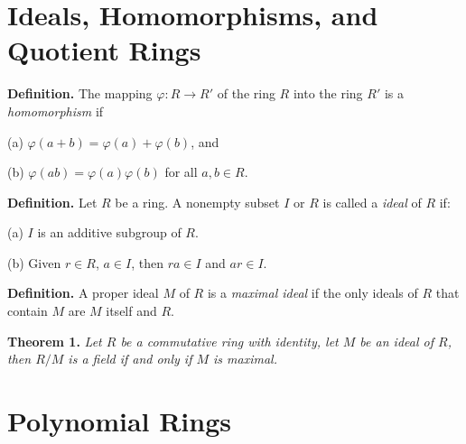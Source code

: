 \documentclass[12pt, a4paper]{article}
\begin{document}
 
 \section{Ideals, Homomorphisms, and Quotient Rings}
 
 \noindent\textbf{Definition.} The mapping $\varphi\colon R\rightarrow R'$ of the ring $R$ into the ring $R'$ is a \textit{homomorphism} if
 
 \begin{description}
    \item (a) $\varphi(a+b)=\varphi(a)+\varphi(b)$, and
    \item (b) $\varphi(ab)=\varphi(a)\varphi(b)$ for all $a,b\in R$.
 \end{description}
 
 \vspace{2mm}
 
 \noindent\textbf{Definition.} Let $R$ be a ring. A nonempty subset $I$ or $R$ is called a \textit{ideal} of $R$ if:
 
 \begin{description}
    \item (a) $I$ is an additive subgroup of $R$.
    \item (b) Given $r\in R$, $a\in I$, then $ra\in I$ and $ar\in I$. 
 \end{description}
 
 \vspace{2mm}
 
 \noindent\textbf{Definition.} A proper ideal $M$ of $R$ is a \textit{maximal ideal} if the only ideals of $R$ that contain $M$ are $M$ itself and $R$.
 
 \vspace{4mm}
 
 \noindent\textbf{Theorem 1.} \textit{Let $R$ be a commutative ring with identity, let $M$ be an ideal of $R$, then $R/M$ is a field if and only if $M$ is maximal.}
 
 \section{Polynomial Rings}
 
 
 
 
\end{document}
